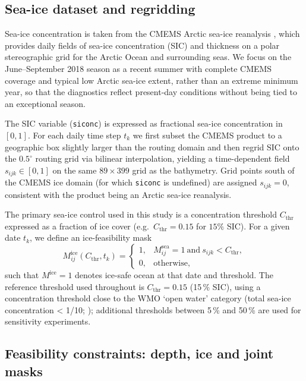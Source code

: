\subsection{Sea-ice dataset and regridding}
\label{sec:ice_data}

Sea-ice concentration is taken from the CMEMS Arctic sea-ice
reanalysis \citep{CMEMS_SeaIce_Reanalysis}, which provides daily fields of
sea-ice concentration (SIC) and thickness on a polar stereographic grid
for the Arctic Ocean and surrounding seas. We focus on the June--September 2018 season as a recent summer with complete CMEMS coverage and typical low Arctic sea-ice extent, rather than an extreme minimum year, so that the diagnostics reflect present-day conditions without being tied to an exceptional season.


The SIC variable (\texttt{siconc}) is expressed as fractional sea-ice
concentration in $[0,1]$. For each daily time step $t_k$ we first
subset the CMEMS product to a geographic box slightly larger than the
routing domain and then regrid SIC onto the $0.5^{\circ}$ routing grid
via bilinear interpolation, yielding a time-dependent field
$s_{ijk} \in [0,1]$ on the same $89 \times 399$ grid as the bathymetry.
Grid points south of the CMEMS ice domain (for which \texttt{siconc} is
undefined) are assigned $s_{ijk}=0$, consistent with the product being
an Arctic sea-ice reanalysis.

The primary sea-ice control used in this study is a concentration
threshold $C_{\mathrm{thr}}$ expressed as a fraction of ice cover
(e.g.\ $C_{\mathrm{thr}} = 0.15$ for $15\%$ SIC). For a given date
$t_k$, we define an ice-feasibility mask
\begin{equation}
  M^{\mathrm{ice}}_{ij}(C_{\mathrm{thr}}, t_k) =
    \begin{cases}
      1, & M^{\mathrm{sea}}_{ij}=1 \ \text{and}\ s_{ijk} < C_{\mathrm{thr}},\\[3pt]
      0, & \text{otherwise},
    \end{cases}
\end{equation}
such that $M^{\mathrm{ice}}=1$ denotes ice-safe ocean at that date and
threshold. The reference threshold used throughout is
$C_{\mathrm{thr}} = 0.15$ (15\,\% SIC), using a concentration threshold close to the WMO ‘open water’ category (total sea-ice concentration < 1/10; \citet{WMO259}); additional thresholds between 5\,\% and
50\,\% are used for sensitivity experiments.



\subsection{Feasibility constraints: depth, ice and joint masks}
\label{sec:constraints}

